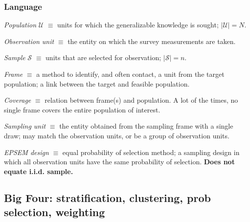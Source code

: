 \documentclass[handout]{beamer}
\begin{document}
\begin{frame}\frametitle{Language}

\textit{Population} $\mathcal U$ $\equiv$ units for which the generalizable knowledge is sought; $|\mathcal{U}|=N$.

\smallskip

\textit{Observation unit} $\equiv$ the entity on which the survey measurements are
taken.

\smallskip

\textit{Sample} $\mathcal S$ $\equiv$ units that are selected for observation; $|\mathcal{S}|=n$.

\smallskip

\textit{Frame} $\equiv$ a method to identify, and often contact, a unit from the target population; a link between the target and feasible population.

\smallskip

\textit{Coverage} $\equiv$ relation between frame(s) and population.
A lot of the times, no single frame covers the entire population of interest.

\smallskip

\textit{Sampling unit} $\equiv$ the entity obtained from the sampling frame
with a single draw;
may match the observation units, or be a group of observation units.

\smallskip

\textit{EPSEM design} $\equiv$ equal probability of selection method; a sampling
design in which all observation units have the same probability of selection.
\textbf{Does not equate i.i.d. sample.}

\end{frame}

\subsection{Big Four: stratification, clustering, prob selection, weighting}
\end{document}
